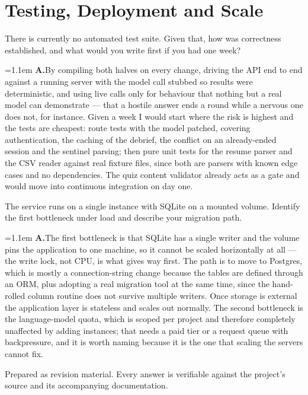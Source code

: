 \documentclass[11pt,a4paper]{article}
\newcommand{\ans}[1]{%
  \par\vspace{0.32em}%
  \begingroup
  \small\color{answerink}%
  \leftskip=1.1em
  \noindent\textbf{\color{accent}A.}\hspace{0.45em}#1\par
  \endgroup
  \vspace{0.1em}%
}
\begin{document}
\section{Testing, Deployment and Scale}
\begin{questions}[resume]

\item There is currently no automated test suite. Given that, how was correctness
established, and what would you write first if you had one week?
\ans{By compiling both halves on every change, driving the API end to end against
a running server with the model call stubbed so results were deterministic, and
using live calls only for behaviour that nothing but a real model can demonstrate
--- that a hostile answer ends a round while a nervous one does not, for instance.
Given a week I would start where the risk is highest and the tests are cheapest:
route tests with the model patched, covering authentication, the caching of the
debrief, the conflict on an already-ended session and the sentinel parsing; then
pure unit tests for the resume parser and the CSV reader against real fixture
files, since both are parsers with known edge cases and no dependencies. The quiz
content validator already acts as a gate and would move into continuous
integration on day one.}

\item The service runs on a single instance with SQLite on a mounted volume.
Identify the first bottleneck under load and describe your migration path.
\ans{The first bottleneck is that SQLite has a single writer and the volume pins
the application to one machine, so it cannot be scaled horizontally at all --- the
write lock, not CPU, is what gives way first. The path is to move to Postgres,
which is mostly a connection-string change because the tables are defined through
an ORM, plus adopting a real migration tool at the same time, since the
hand-rolled column routine does not survive multiple writers. Once storage is
external the application layer is stateless and scales out normally. The second
bottleneck is the language-model quota, which is scoped per project and therefore
completely unaffected by adding instances; that needs a paid tier or a request
queue with backpressure, and it is worth naming because it is the one that
scaling the servers cannot fix.}

\end{questions}

\vfill
\noindent\color{muted}\small
Prepared as revision material. Every answer is verifiable against the project's
source and its accompanying documentation.
\color{ink}
\end{document}
